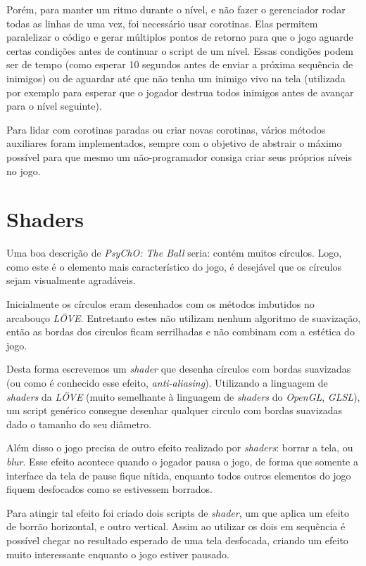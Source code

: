 Porém, para manter um ritmo durante o nível, e não fazer o gerenciador rodar todas as linhas de uma vez, foi necessário usar corotinas. Elas permitem paralelizar o código e gerar múltiplos pontos de retorno para que o jogo aguarde certas condições antes de continuar o script de um nível. Essas condições podem ser de tempo (como esperar 10 segundos antes de enviar a próxima sequência de inimigos) ou de aguardar até que não tenha um inimigo vivo na tela (utilizada por exemplo para esperar que o jogador destrua todos inimigos antes de avançar para o nível seguinte).

Para lidar com corotinas paradas ou criar novas corotinas, vários métodos auxiliares foram implementados, sempre com o objetivo de abstrair o máximo possível para que mesmo um não-programador consiga criar seus próprios níveis no jogo.

\section{Shaders}
\label{sec:shaders}

Uma boa descrição de \textit{PsyChO: The Ball} seria: contém muitos círculos. Logo, como este é o elemento mais característico do jogo, é desejável que os círculos sejam visualmente agradáveis.

Inicialmente os círculos eram desenhados com os métodos imbutidos no arcabouço \textit{LÖVE}. Entretanto estes não utilizam nenhum algoritmo de suavização, então as bordas dos circulos ficam serrilhadas e não combinam com a estética do jogo.

Desta forma escrevemos um \textit{shader} que desenha círculos com bordas suavizadas (ou como é conhecido esse efeito, \textit{anti-aliasing}). Utilizando a linguagem de \textit{shaders} da \textit{LÖVE} (muito semelhante à linguagem de \textit{shaders} do \textit{OpenGL}, \textit{GLSL}), um script genérico consegue desenhar qualquer circulo com bordas suavizadas dado o tamanho do seu diâmetro.

Além disso o jogo precisa de outro efeito realizado por \textit{shaders}: borrar a tela, ou \textit{blur}. Esse efeito acontece quando o jogador pausa o jogo, de forma que somente a interface da tela de pause fique nítida, enquanto todos outros elementos do jogo fiquem desfocados como se estivessem borrados.

Para atingir tal efeito foi criado dois scripts de \textit{shader}, um que aplica um efeito de borrão horizontal, e outro vertical. Assim ao utilizar os dois em sequência é possível chegar no resultado esperado de uma tela desfocada, criando um efeito muito interessante enquanto o jogo estiver pausado.

